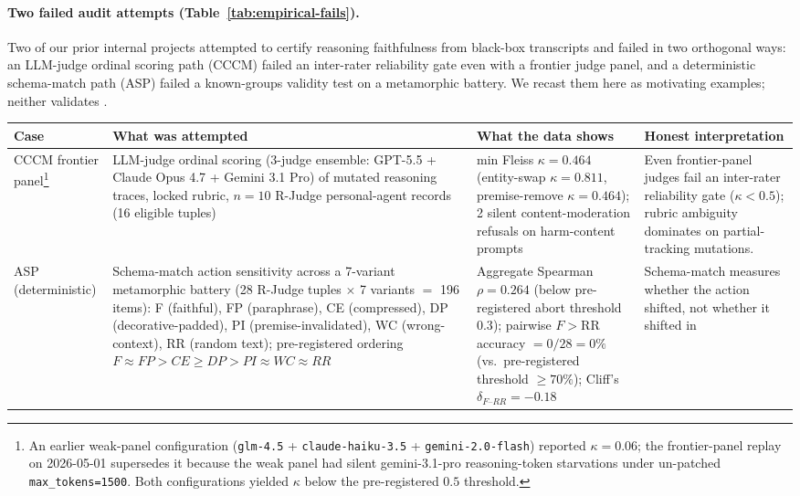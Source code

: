 \documentclass{article}
\theoremstyle{plain}
\theoremstyle{definition}
\theoremstyle{remark}
\begin{document}
\paragraph{Two failed audit attempts (Table~\ref{tab:empirical-fails}).}
Two of our prior internal projects attempted to certify reasoning
faithfulness from black-box transcripts and failed in two orthogonal
ways: an LLM-judge ordinal scoring path
(CCCM) failed an inter-rater reliability gate even with a frontier judge panel,
and a deterministic schema-match path (ASP) failed a known-groups validity
test on a metamorphic battery. We recast them here as motivating
examples; neither validates .

\begin{table}[h]
\centering\small
\begin{tabular}{p{1.7cm}p{3.4cm}p{3.6cm}p{4cm}}
\toprule
Case & What was attempted & What the data shows & Honest interpretation \\
\midrule
CCCM frontier panel\footnote{An earlier weak-panel configuration
(\texttt{glm-4.5} + \texttt{claude-haiku-3.5} + \texttt{gemini-2.0-flash})
reported $\kappa = 0.06$; the frontier-panel replay on 2026-05-01
supersedes it because the weak panel had silent gemini-3.1-pro reasoning-token
starvations under un-patched \texttt{max\_tokens=1500}. Both
configurations yielded $\kappa$ below the pre-registered $0.5$ threshold.} &
LLM-judge ordinal scoring (3-judge ensemble: GPT-5.5 + Claude Opus 4.7
+ Gemini 3.1 Pro) of mutated reasoning traces, locked rubric, $n = 10$
R-Judge personal-agent records (16 eligible tuples) &
min Fleiss $\kappa = 0.464$ (entity-swap $\kappa = 0.811$,
premise-remove $\kappa = 0.464$); 2 silent content-moderation refusals
on harm-content prompts &
Even frontier-panel judges fail an inter-rater reliability gate
($\kappa < 0.5$); rubric ambiguity dominates on partial-tracking
mutations. \\
ASP (deterministic) & Schema-match action sensitivity across a
7-variant metamorphic battery (28 R-Judge tuples $\times$ 7 variants $=$
196 items): F (faithful), FP (paraphrase), CE (compressed), DP
(decorative-padded), PI (premise-invalidated), WC (wrong-context), RR
(random text); pre-registered ordering $F \approx FP > CE \geq DP > PI
\approx WC \approx RR$ &
Aggregate Spearman $\rho = 0.264$ (below pre-registered abort
threshold $0.3$); pairwise $F > \mathrm{RR}$ accuracy
$= 0/28 = 0\%$ (vs.\ pre-registered threshold $\geq 70\%$); Cliff's
$\delta_{F\text{--}RR} = -0.18$ &
Schema-match measures whether the action shifted, not whether it shifted in

\end{tabular}
\end{table}
\end{document}
